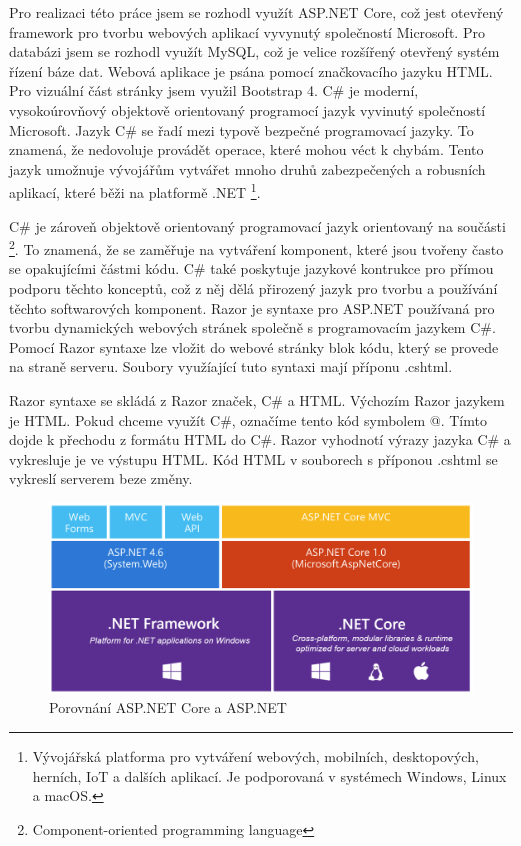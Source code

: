 \documentclass[a4paper, 12pt]{report}
\begin{document}
		Pro realizaci této práce jsem se rozhodl využít ASP.NET Core, což jest otevřený framework pro tvorbu webových aplikací vyvynutý společností Microsoft. Pro 	 databázi jsem se rozhodl využít MySQL, což je velice rozšířený otevřený systém řízení báze dat. Webová aplikace je psána pomocí značkovacího jazyku HTML. Pro vizuální část stránky jsem využil Bootstrap 4.
			C\# je moderní, vysokoúrovňový objektově orientovaný programocí jazyk vyvinutý společností Microsoft. Jazyk C\# se řadí mezi typově bezpečné programovací jazyky. To znamená, že nedovoluje provádět operace, které mohou véct k chybám. Tento jazyk umožnuje vývojářům vytvářet mnoho druhů zabezpečených a robusních aplikací, které běži na platformě .NET \footnote{Vývojářská platforma pro vytváření webových, mobilních, desktopových, herních, IoT a dalších aplikací. Je podporovaná v systémech Windows, Linux a macOS.}.\par
			C\# je zároveň objektově orientovaný programovací jazyk orientovaný na součásti \footnote{Component-oriented programming language}. To znamená, že se zaměřuje na vytváření komponent, které jsou tvořeny často se opakujícími částmi kódu. C\# také poskytuje jazykové kontrukce pro přímou podporu těchto konceptů, což z něj dělá přirozený jazyk pro tvorbu a používání těchto softwarových komponent.\cite{CSharp}
		Razor je syntaxe pro ASP.NET používaná pro tvorbu dynamických webových stránek společně s programovacím jazykem C\#. Pomocí Razor syntaxe lze vložit do webové stránky blok kódu, který se provede na straně serveru. Soubory využíající tuto syntaxi mají příponu .cshtml.\par
		Razor syntaxe se skládá z Razor značek, C\# a HTML. Výchozím Razor jazykem je HTML. Pokud chceme využít C\#, označíme tento kód symbolem @. Tímto dojde k přechodu z formátu HTML do C\#. Razor vyhodnotí výrazy jazyka C\# a vykresluje je ve výstupu HTML. Kód HTML v souborech s příponou .cshtml se vykreslí serverem beze změny.\cite{Razor}
			\begin{figure}[h!]
				\includegraphics[width=\textwidth]{aspnetcore_aspnet}
				\caption{Porovnání ASP.NET Core a ASP.NET \cite{ASPNETCORE_ASPNET}}
				\label{ASP.NET Core a ASP.NET}
			\end{figure}
\end{document}

